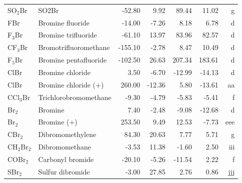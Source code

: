 \begin{table}
\begin{center}
\begin{tabular}{llrrrrr}
 SO$_2$Br       & SO2Br                           &   -52.80    &     9.92  &    89.44  &    11.02  &      g\\
 FBr         & Bromine fluoride                &   -14.00    &    -7.26  &     8.18  &     6.78  &      d\\
 F$_3$Br        & Bromine trifluoride             &   -61.10    &    13.97  &    83.96  &    82.57  &      d\\
 CF$_3$Br       & Bromotrifluoromethane           &  -155.10    &    -2.78  &     8.47  &    10.49  &      d\\
 F$_5$Br        & Bromine pentafluoride           &  -102.50    &    26.63  &   207.34  &   183.61  &      d\\
 ClBr        & Bromine chloride                &     3.50    &    -6.70  &   -12.99  &   -14.13  &      d\\
 ClBr        & Bromine chloride (+)            &   260.00    &   -12.36  &     5.80  &   -13.61  &     aa\\
 CCl$_3$Br      & Trichlorobromomethane           &    -9.30    &    -4.79  &    -5.83  &    -5.41  &      f\\
 Br$_2$         & Bromine                         &     7.40    &    -2.48  &    -9.08  &   -12.68  &      d\\
 Br$_2$         & Bromine (+)                     &   253.50    &     9.49  &    12.53  &    -7.73  &    eee\\
 CBr$_2$        & Dibromomethylene                &    84.30    &    20.63  &     7.77  &     5.71  &      g\\
 CH$_2$Br$_2$      & Dibromomethane                  &    -3.53    &    11.38  &    -1.60  &     2.50  &    iii\\
 COBr$_2$       & Carbonyl bromide                &   -20.10    &    -5.26  &   -11.54  &     2.22  &      f\\
 SBr$_2$        & Sulfur dibromide                &    -3.00    &    27.85  &     2.76  &     0.86  &    jjj\\
\hline
\end{tabular}
\end{center}
\end{table}
\clearpage

